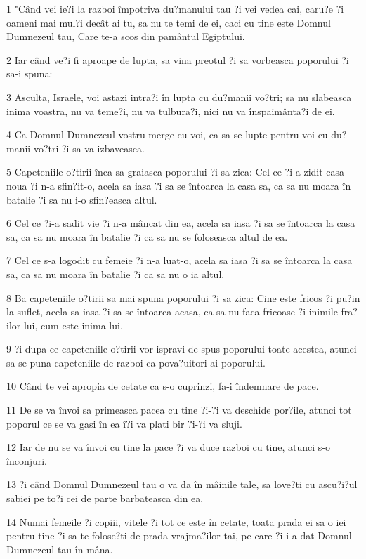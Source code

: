 \par 1 "Când vei ie?i la razboi împotriva du?manului tau ?i vei vedea cai, caru?e ?i oameni mai mul?i decât ai tu, sa nu te temi de ei, caci cu tine este Domnul Dumnezeul tau, Care te-a scos din pamântul Egiptului.
\par 2 Iar când ve?i fi aproape de lupta, sa vina preotul ?i sa vorbeasca poporului ?i sa-i spuna:
\par 3 Asculta, Israele, voi astazi intra?i în lupta cu du?manii vo?tri; sa nu slabeasca inima voastra, nu va teme?i, nu va tulbura?i, nici nu va înspaimânta?i de ei.
\par 4 Ca Domnul Dumnezeul vostru merge cu voi, ca sa se lupte pentru voi cu du?manii vo?tri ?i sa va izbaveasca.
\par 5 Capeteniile o?tirii înca sa graiasca poporului ?i sa zica: Cel ce ?i-a zidit casa noua ?i n-a sfin?it-o, acela sa iasa ?i sa se întoarca la casa sa, ca sa nu moara în batalie ?i sa nu i-o sfin?easca altul.
\par 6 Cel ce ?i-a sadit vie ?i n-a mâncat din ea, acela sa iasa ?i sa se întoarca la casa sa, ca sa nu moara în batalie ?i ca sa nu se foloseasca altul de ea.
\par 7 Cel ce s-a logodit cu femeie ?i n-a luat-o, acela sa iasa ?i sa se întoarca la casa sa, ca sa nu moara în batalie ?i ca sa nu o ia altul.
\par 8 Ba capeteniile o?tirii sa mai spuna poporului ?i sa zica: Cine este fricos ?i pu?in la suflet, acela sa iasa ?i sa se întoarca acasa, ca sa nu faca fricoase ?i inimile fra?ilor lui, cum este inima lui.
\par 9 ?i dupa ce capeteniile o?tirii vor ispravi de spus poporului toate acestea, atunci sa se puna capeteniile de razboi ca pova?uitori ai poporului.
\par 10 Când te vei apropia de cetate ca s-o cuprinzi, fa-i îndemnare de pace.
\par 11 De se va învoi sa primeasca pacea cu tine ?i-?i va deschide por?ile, atunci tot poporul ce se va gasi în ea î?i va plati bir ?i-?i va sluji.
\par 12 Iar de nu se va învoi cu tine la pace ?i va duce razboi cu tine, atunci s-o înconjuri.
\par 13 ?i când Domnul Dumnezeul tau o va da în mâinile tale, sa love?ti cu ascu?i?ul sabiei pe to?i cei de parte barbateasca din ea.
\par 14 Numai femeile ?i copiii, vitele ?i tot ce este în cetate, toata prada ei sa o iei pentru tine ?i sa te folose?ti de prada vrajma?ilor tai, pe care ?i i-a dat Domnul Dumnezeul tau în mâna.
